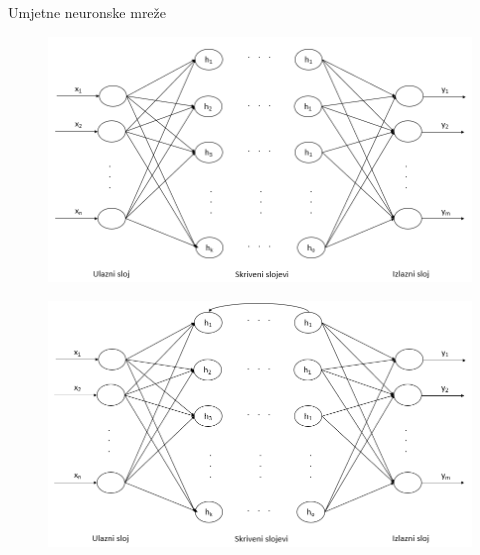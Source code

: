 \documentclass{beamer}
\begin{document}
    \begin{frame}{Umjetne neuronske mreže}
        \begin{figure}
            \includegraphics[scale=0.3]{img/ann.png}
        \end{figure}
        \begin{figure}
            \includegraphics[scale=0.3]{img/cycle-ann.png}
        \end{figure}
    \end{frame}
    
\end{document}
